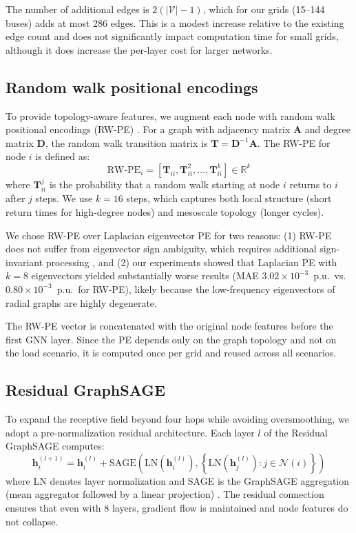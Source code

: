 \documentclass[preprint,review,12pt]{elsarticle}
\begin{document}
The number of additional edges is $2(|\mathcal{V}| - 1)$, which for our grids (15--144 buses) adds at most 286 edges. This is a modest increase relative to the existing edge count and does not significantly impact computation time for small grids, although it does increase the per-layer cost for larger networks.

\subsection{Random walk positional encodings}

To provide topology-aware features, we augment each node with random walk positional encodings (RW-PE) \cite{b15}. For a graph with adjacency matrix $\mathbf{A}$ and degree matrix $\mathbf{D}$, the random walk transition matrix is $\mathbf{T} = \mathbf{D}^{-1}\mathbf{A}$. The RW-PE for node $i$ is defined as:
\begin{equation}
\text{RW-PE}_i = \left[\mathbf{T}_{ii}, \mathbf{T}^2_{ii}, \ldots, \mathbf{T}^k_{ii}\right] \in \mathbb{R}^k
\label{eq:rwpe}
\end{equation}
where $\mathbf{T}^j_{ii}$ is the probability that a random walk starting at node $i$ returns to $i$ after $j$ steps. We use $k=16$ steps, which captures both local structure (short return times for high-degree nodes) and mesoscale topology (longer cycles).

We chose RW-PE over Laplacian eigenvector PE for two reasons: (1) RW-PE does not suffer from eigenvector sign ambiguity, which requires additional sign-invariant processing \cite{b14}, and (2) our experiments showed that Laplacian PE with $k=8$ eigenvectors yielded substantially worse results (MAE $3.02 \times 10^{-3}$~p.u.\ vs.\ $0.80 \times 10^{-3}$~p.u.\ for RW-PE), likely because the low-frequency eigenvectors of radial graphs are highly degenerate.

The RW-PE vector is concatenated with the original node features before the first GNN layer. Since the PE depends only on the graph topology and not on the load scenario, it is computed once per grid and reused across all scenarios.

\subsection{Residual GraphSAGE}

To expand the receptive field beyond four hops while avoiding oversmoothing, we adopt a pre-normalization residual architecture. Each layer $l$ of the Residual GraphSAGE computes:
\begin{equation}
\mathbf{h}_i^{(l+1)} = \mathbf{h}_i^{(l)} + \text{SAGE}\!\left(\text{LN}\!\left(\mathbf{h}_i^{(l)}\right), \left\{\text{LN}\!\left(\mathbf{h}_j^{(l)}\right) : j \in \mathcal{N}(i)\right\}\right)
\label{eq:residual}
\end{equation}
where LN denotes layer normalization and SAGE is the GraphSAGE aggregation (mean aggregator followed by a linear projection) \cite{b22}. The residual connection ensures that even with 8 layers, gradient flow is maintained and node features do not collapse.
\end{document}
